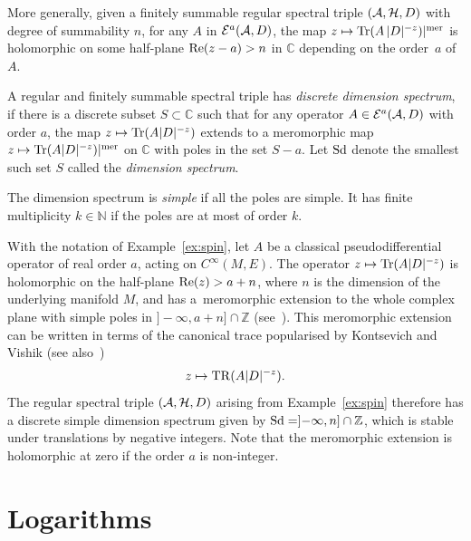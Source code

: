 \documentclass[pdftex]{sigma}
\def \C{\mathbb C}
\def \Z {\mathbb Z}
\def \N {\mathbb N}
\def \Ci {{C^\infty}}
\numberwithin{equation}{section}
\begin{document}
More generally, given a f\/initely summable regular spectral triple  $\left({\cal A}, {\cal H},
  D\right)$ with degree of summability $n$, for any $A $ in ${\cal E}^a({\cal A}, D)$, the map $z\mapsto {\rm Tr}(A \,\vert D\vert^{-z})\vert^{\rm
  mer}$ is holomorphic on some half-plane ${\rm Re}(z-a)>n$ in  $\C$
depending on the order~$a$ of~$A$.

\begin{definition}
A regular and f\/initely summable spectral triple  has   {\it  discrete dimension
spectrum}, if  there is a discrete subset $S\subset \C$ such that for any
operator $A\in {\cal E}^a({\cal A}, D)$ with order $a$, the  map
 $z\mapsto {\rm Tr}(A  \vert D\vert^{-z})$
extends to a meromorphic map  $z\mapsto
 {\rm Tr}(A  \vert D\vert^{-z})\vert^{\rm
  mer}$ on $\C$
with  poles   in the  set
$S-a$. Let ${\rm Sd}$ denote the smallest such set $S$ called the {\it dimension
spectrum}.

 The dimension spectrum is {\it simple} if all the poles are
simple. It has f\/inite multiplicity  $k\in \N$ if the poles are at most of order $k$.\end{definition}

\begin{example} With the notation of   Example~\ref{ex:spin}, let $A$ be a
  classical pseudodif\/ferential operator of real order $a$, acting on
  $\Ci(M, E)$. The operator $z\mapsto {\rm Tr}(A  \vert
   D\vert^{-z})$  is holomorphic on  the half-plane ${\rm Re}(z)>a+n$, where
   $n$ is the dimension of the underlying manifold $M$, and has a~meromorphic
   extension to the whole complex plane with simple poles  in $]{-}\infty,
   a+n]\cap \Z$ (see~\cite{Se}).   This meromorphic extension can be written
   in terms of the canonical trace popularised by Kontsevich and Vishik \cite{KV} (see also~\cite{L})
   \[
   z\mapsto {\rm TR}(A  \vert    D\vert^{-z}).
   \]   The regular spectral triple $\left({\cal A}, {\cal H}, D\right)$
 arising from  Example~\ref{ex:spin}
 therefore has a  discrete simple dimension spectrum given by
  ${\rm Sd}= ]{-}\infty, n]\cap \Z$, which  is stable
under translations by negative integers. Note that the meromorphic extension is
holomorphic at zero if the order $a$ is non-integer.
\end{example}


\section{Logarithms}\label{section3}
\end{document}
